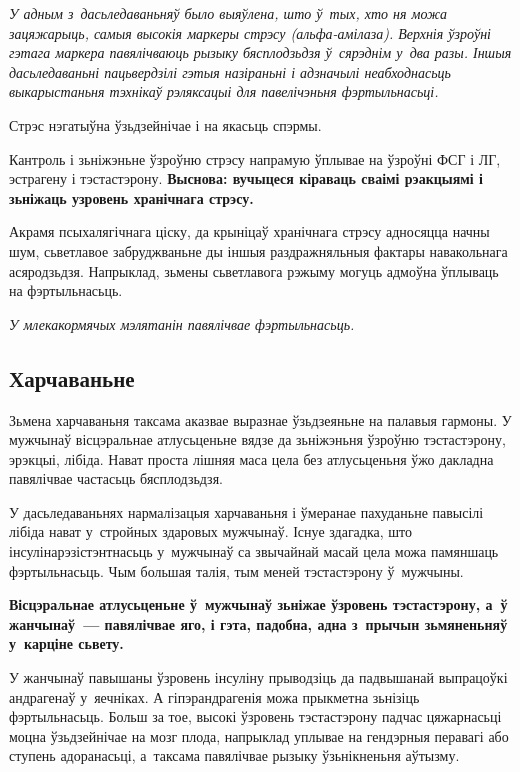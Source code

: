 \emph{У адным з~дасьледаваньняў было выяўлена, што ў~тых, хто ня можа зацяжарыць, самыя высокія маркеры стрэсу (альфа-амілаза). Верхнія ўзроўні гэтага маркера павялічваюць рызыку бясплодзьдзя ў~сярэднім у~два разы. Іншыя дасьледаваньні пацьвердзілі гэтыя назіраньні і адзначылі неабходнасьць выкарыстаньня тэхнікаў рэляксацыі для павелічэньня фэртыльнасьці.}


Стрэс нэгатыўна ўзьдзейнічае і на якасьць спэрмы. 

Кантроль і зьніжэньне ўзроўню стрэсу напрамую ўплывае на ўзроўні ФСГ і ЛГ, эстрагену і тэстастэрону. \textbf{Выснова: вучыцеся кіраваць сваімі рэакцыямі і зьніжаць узровень хранічнага стрэсу.}

Акрамя псыхалягічнага ціску, да крыніцаў хранічнага стрэсу адносяцца начны шум, сьветлавое забруджваньне ды іншыя раздражняльныя фактары навакольнага асяродзьдзя. Напрыклад, зьмены сьветлавога рэжыму могуць адмоўна ўплываць на фэртыльнасьць. 

\emph{У млекакормячых мэлятанін павялічвае фэртыльнасьць.}

\subsection*{Харчаваньне}

Зьмена харчаваньня таксама аказвае выразнае ўзьдзеяньне на палавыя гармоны. У мужчынаў вісцэральнае атлусьценьне вядзе да зьніжэньня ўзроўню тэстастэрону, эрэкцыі, лібіда. Нават проста лішняя маса цела без атлусьценьня ўжо дакладна павялічвае частасьць бясплодзьдзя.

У дасьледаваньнях нармалізацыя харчаваньня і ўмеранае пахуданьне павысілі лібіда нават у~стройных здаровых мужчынаў. Існуе здагадка, што інсулінарэзістэнтнасьць у~мужчынаў са звычайнай масай цела можа памяншаць фэртыльнасьць. Чым большая талія, тым меней тэстастэрону ў~мужчыны.

\textbf{Вісцэральнае атлусьценьне ў~мужчынаў зьніжае ўзровень тэстастэрону, а~ў жанчынаў~--- павялічвае яго, і гэта, падобна, адна з~прычын зьмяненьняў у~карціне сьвету.}

У жанчынаў павышаны ўзровень інсуліну прыводзіць да падвышанай выпрацоўкі андрагенаў у~яечніках. А гіпэрандрагенія можа прыкметна зьнізіць фэртыльнасьць. Больш за тое, высокі ўзровень тэстастэрону падчас цяжарнасьці моцна ўзьдзейнічае на мозг плода, напрыклад уплывае на гендэрныя перавагі або ступень адоранасьці, а~таксама павялічвае рызыку ўзьнікненьня аўтызму.

